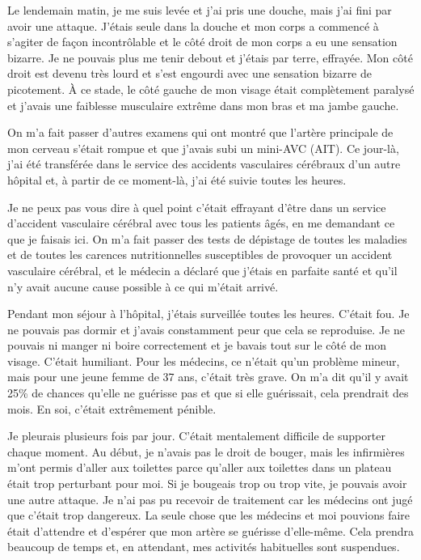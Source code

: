 Le lendemain matin, je me suis levée et j'ai pris une douche, mais j'ai fini par
avoir une attaque. J'étais seule dans la douche et mon corps a commencé à
s'agiter de façon incontrôlable et le côté droit de mon corps a eu une sensation
bizarre. Je ne pouvais plus me tenir debout et j'étais par terre, effrayée. Mon
côté droit est devenu très lourd et s'est engourdi avec une sensation bizarre de
picotement. À ce stade, le côté gauche de mon visage était complètement paralysé
et j'avais une faiblesse musculaire extrême dans mon bras et ma jambe gauche.

On m'a fait passer d'autres examens qui ont montré que l'artère principale de
mon cerveau s'était rompue et que j'avais subi un mini-AVC (AIT). Ce jour-là,
j'ai été transférée dans le service des accidents vasculaires cérébraux d'un
autre hôpital et, à partir de ce moment-là, j'ai été suivie toutes les heures.

Je ne peux pas vous dire à quel point c'était effrayant d'être dans un service
d'accident vasculaire cérébral avec tous les patients âgés, en me demandant ce
que je faisais ici. On m'a fait passer des tests de dépistage de toutes les
maladies et de toutes les carences nutritionnelles susceptibles de provoquer un
accident vasculaire cérébral, et le médecin a déclaré que j'étais en parfaite
santé et qu'il n'y avait aucune cause possible à ce qui m'était arrivé.

Pendant mon séjour à l'hôpital, j'étais surveillée toutes les heures. C'était
fou. Je ne pouvais pas dormir et j'avais constamment peur que cela se
reproduise. Je ne pouvais ni manger ni boire correctement et je bavais tout sur
le côté de mon visage. C'était humiliant. Pour les médecins, ce n'était qu'un
problème mineur, mais pour une jeune femme de 37 ans, c'était très grave. On m'a
dit qu'il y avait 25\% de chances qu'elle ne guérisse pas et que si elle
guérissait, cela prendrait des mois. En soi, c'était extrêmement pénible.

Je pleurais plusieurs fois par jour. C'était mentalement difficile de supporter
chaque moment. Au début, je n'avais pas le droit de bouger, mais les infirmières
m'ont permis d'aller aux toilettes parce qu'aller aux toilettes dans un plateau
était trop perturbant pour moi. Si je bougeais trop ou trop vite, je pouvais
avoir une autre attaque. Je n'ai pas pu recevoir de traitement car les médecins
ont jugé que c'était trop dangereux. La seule chose que les médecins et moi
pouvions faire était d'attendre et d'espérer que mon artère se guérisse
d'elle-même. Cela prendra beaucoup de temps et, en attendant, mes activités
habituelles sont suspendues.

